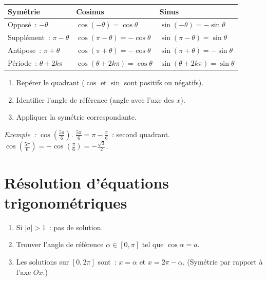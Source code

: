 \begin{prop}
\begin{center}
\renewcommand{\arraystretch}{1.5}
\begin{tabular}{|l|l|l|}
\hline
\rowcolor{BN!10}
Sym\'etrie & Cosinus & Sinus \\
\hline
Oppos\'e~: $-\theta$ & $\cos(-\theta)=\cos\theta$ & $\sin(-\theta)=-\sin\theta$ \\
Suppl\'ement~: $\pi-\theta$ & $\cos(\pi-\theta)=-\cos\theta$ & $\sin(\pi-\theta)=\sin\theta$ \\
Antipose~: $\pi+\theta$ & $\cos(\pi+\theta)=-\cos\theta$ & $\sin(\pi+\theta)=-\sin\theta$ \\
P\'eriode~: $\theta+2k\pi$ & $\cos(\theta+2k\pi)=\cos\theta$ & $\sin(\theta+2k\pi)=\sin\theta$ \\
\hline
\end{tabular}
\end{center}
\end{prop}

\begin{methode}
\begin{enumerate}
  \item Rep\'erer le quadrant ($\cos$ et $\sin$ sont positifs ou n\'egatifs).
  \item Identifier l'angle de r\'ef\'erence (angle avec l'axe des $x$).
  \item Appliquer la sym\'etrie correspondante.
\end{enumerate}
\emph{Exemple~:} $\cos(\frac{5\pi}{6})$.
$\frac{5\pi}{6} = \pi - \frac{\pi}{6}$~: second quadrant.
$\cos(\frac{5\pi}{6}) = -\cos(\frac{\pi}{6}) = -\frac{\sqrt{3}}{2}$.
\end{methode}


\section{R\'esolution d'\'equations trigonom\'etriques}

\begin{methode}[R\'esoudre $\cos x = a$ sur {$[0, 2\pi]$}]
\begin{enumerate}
  \item Si $|a|>1$~: pas de solution.
  \item Trouver l'angle de r\'ef\'erence $\alpha\in[0,\pi]$ tel que $\cos\alpha=a$.
  \item Les solutions sur $[0,2\pi]$ sont~: $x=\alpha$ et $x=2\pi-\alpha$.
        (Sym\'etrie par rapport \`a l'axe $Ox$.)
\end{enumerate}
\end{methode}

